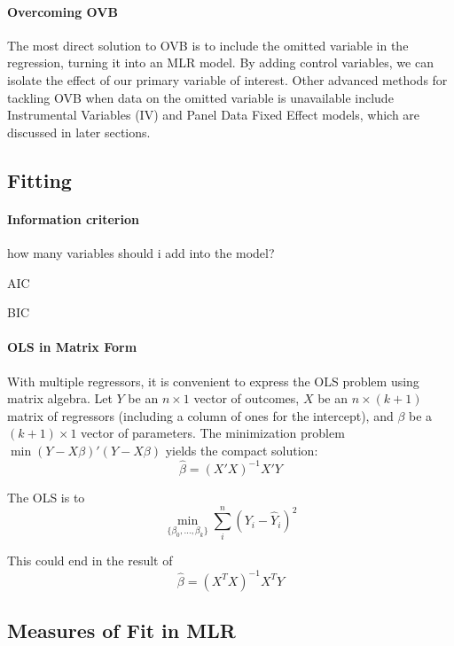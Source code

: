 \documentclass{article}
\begin{document}
\paragraph{Overcoming OVB}
The most direct solution to OVB is to include the omitted variable in the regression, turning it into an MLR model. By adding control variables, we can isolate the effect of our primary variable of interest. Other advanced methods for tackling OVB when data on the omitted variable is unavailable include Instrumental Variables (IV) and Panel Data Fixed Effect models, which are discussed in later sections.




\subsection{Fitting}

\paragraph{Information criterion}

how many variables should i add into the model?

AIC

BIC

\paragraph{OLS in Matrix Form}
With multiple regressors, it is convenient to express the OLS problem using matrix algebra. Let $Y$ be an $n \times 1$ vector of outcomes, $X$ be an $n \times (k+1)$ matrix of regressors (including a column of ones for the intercept), and $\beta$ be a $(k+1) \times 1$ vector of parameters. The minimization problem $\min (Y-X\beta)'(Y-X\beta)$ yields the compact solution:
\begin{equation}
  \hat{\beta}=(X'X)^{-1}X'Y
\end{equation}

The OLS is to
\begin{equation}
  \min\limits_{\{\beta_0,\dots,\beta_k\}} \sum\limits_i^n (Y_i-\hat Y_i)^2
\end{equation}

This could end in the result of 
\begin{equation}
  \hat{\beta}=(X^T X)^{-1}X^T Y
\end{equation}




\subsection{Measures of Fit in MLR}
\label{sub:fit_in_mlr}
\end{document}
